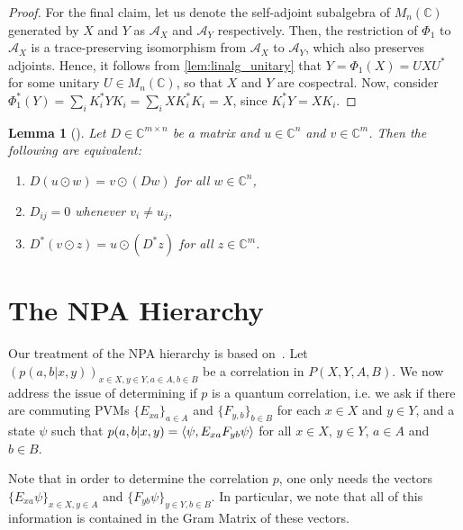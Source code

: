 \documentclass[a4paper,onecolumn,11pt,accepted=2026-01-06]{quantumarticle}
\theoremstyle{plain}
\newtheorem{lem}[thm]{Lemma}
\theoremstyle{remark}
\theoremstyle{definition}
\newcommand{\complex}{\mathbb{C}}
\def\calA{{\mathcal A}} \def\calB{{\mathcal B}} \def\calC{{\mathcal C}}
\begin{document}
\begin{proof}
    For the final claim, let us denote the self-adjoint subalgebra of $M_n(\mathbb{C})$ generated by $X$ and $Y$ as $\calA_X$ and $\calA_Y$ respectively. Then, the restriction of $\Phi_1$ to $\calA_X$ is a trace-preserving isomorphism from $\calA_X$ to $\calA_Y$, which also preserves adjoints. Hence, it follows from \cref{lem:linalg_unitary} that $Y = \Phi_1(X) = UXU^*$ for some unitary $U \in M_n(\mathbb{C})$, so that $X$ and $Y$ are cospectral. Now, consider $\Phi_1^*(Y) = \sum_i K_i^* Y K_i =  \sum_i  X K_i^* K_i = X$, since $K_i^* Y = X K_i$. 
\end{proof}

\begin{lem}[{\cite[Lemma 4.5]{david_mathprog}}]
  \label{lem:linalg_parallel}
  Let $D\in\complex^{m\times n}$ be a matrix and $u\in\complex^n$ and $v \in \complex^{m}$.
  Then the following are equivalent:
  \begin{enumerate}
    \item $D(u\odot w) = v\odot(Dw)$ for all $w\in\complex^n$,
    \item $D_{ij} = 0$ whenever $v_i \neq u_j$,
    \item $D^*(v\odot z) = u\odot(D^*z)$ for all $z\in\complex^m$.
  \end{enumerate}
\end{lem}



\section{The NPA Hierarchy}\label{sec:npa}

Our treatment of the NPA hierarchy is based on~\cite[Chapter 8]{watrous_notes}.
Let $(p(a,b|x,y))_{x \in X, y \in Y, a \in A, b \in B}$ be a correlation in $P(X, Y, A, B)$. We now address the issue of determining if $p$ is a quantum correlation, i.e. we ask if there are commuting PVMs $\{E_{xa}\}_{a \in A}$ and $\{F_{y,b}\}_{b \in B}$ for each $x \in X$ and $y \in Y$, and a state $\psi$ such that $p(a,b|x,y) = \braket{ \psi, E_{xa} F_{yb} \psi}$ for all $x \in X$, $y \in Y$, $a \in A$ and $b \in B$. 

Note that in order to determine the correlation $p$, one only needs the vectors $\{E_{xa}\psi\}_{x\in X, y \in A}$ and $\{F_{yb}\psi\}_{y \in Y, b \in B}$. In particular, we note that all of this information is contained in the Gram Matrix of these vectors. 
\end{document}

